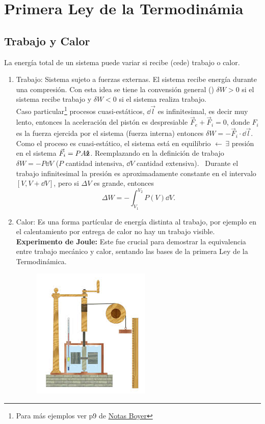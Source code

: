 \begin{enumerate}
\end{enumerate}



\chapter{Primera Ley de la Termodinámia}


\section{Trabajo y Calor}
La energía total de un sistema puede variar si recibe (cede) trabajo o calor.

\begin{enumerate}
	\item Trabajo: Sistema sujeto a fuerzas externas. El sistema recibe energía durante una compresión. Con esta idea se tiene la convensión general () $\delta W > 0$ si el sistema recibe trabajo y $\delta W < 0$ si el sistema realiza trabajo. \\
	Caso particular\footnote{Para más ejemplos ver p9 de \href{https://github.com/DSarceno/ExamenPrivado/blob/main/material_\%C3\%BAtil/termodinamica/Notas\%20Boyer.pdf}{Notas Boyer}} procesos cuasi-estáticos, $\dd{\vec{l}}$ es infinitesimal, es decir muy lento, entonces la aceleración del pistón es despresiable $\vec{F} _e + \vec{F}_i = 0$, donde $F_i$ es la fuerza ejercida por el sistema (fuerza interna) entonces $\delta W = - \vec{F} _i \cdot \dd{\vec{l}}$. Como el proceso es cuasi-estático, el sistema está en equilibrio $\leftarrow \, \exists$ presión en el sistema $\vec{F} _i = PA \vu{z}$. Reemplazando en la definición de trabajo $\delta W = -P\dd{V}$ ($P$ cantidad intensiva, $\dd{V}$ cantidad extensiva). \faExclamationTriangle $\,$ Durante el trabajo infinitesimal la presión es aproximadamente constante en el intervalo $[V,V + \dd{V}]$, pero si $\Delta V$ es grande, entonces
		$$ \Delta W = - \int _{V_1} ^{V_2} P(V) \dd{V}. $$
	\item Calor: Es una forma partícular de energía distinta al trabajo, por ejemplo en el calentamiento por entrega de calor no hay un trabajo visible. \\
	\textbf{Experimento de Joule: } Este fue crucial para demostrar la equivalencia entre trabajo mecánico y calor, sentando las bases de la primera Ley de la Termodinámica. 
	\begin{figure}[H]
		\centering
		\includegraphics[scale=0.4]{./img/experimentoJoule.jpeg}

\end{figure}
\end{enumerate}
